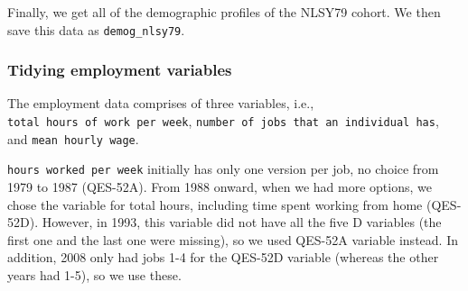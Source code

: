 \documentclass{article}
\begin{document}
Finally, we get all of the demographic profiles of the NLSY79 cohort. We then save this data as \texttt{demog\_nlsy79}.

\hypertarget{tidying-employment-variables}{%
\subsubsection{Tidying employment variables}\label{tidying-employment-variables}}

The employment data comprises of three variables, i.e., \texttt{total\ hours\ of\ work\ per\ week}, \texttt{number\ of\ jobs\ that\ an\ individual\ has}, and \texttt{mean\ hourly\ wage}.

\texttt{hours\ worked\ per\ week} initially has only one version per job, no choice from 1979 to 1987 (QES-52A). From 1988 onward, when we had more options, we chose the variable for total hours, including time spent working from home (QES-52D). However, in 1993, this variable did not have all the five D variables (the first one and the last one were missing), so we used QES-52A variable instead. In addition, 2008 only had jobs 1-4 for the QES-52D variable (whereas the other years had 1-5), so we use these.
\end{document}
